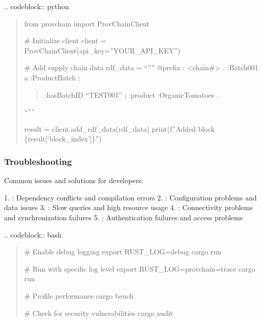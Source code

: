 \documentclass[letterpaper,10pt,english]{sphinxmanual}
\begin{document}
\sphinxAtStartPar
{}
.. code\sphinxhyphen{}block:: python
\begin{quote}

\sphinxAtStartPar
from provchain import ProvChainClient

\sphinxAtStartPar
\# Initialize client
client = ProvChainClient(api\_key=”YOUR\_API\_KEY”)

\sphinxAtStartPar
\# Add supply chain data
rdf\_data = “””
@prefix : \textless{}\sphinxhyphen{}chain\#\textgreater{} .
:Batch001 a :ProductBatch ;
\begin{quote}

\sphinxAtStartPar
:hasBatchID “TEST\sphinxhyphen{}001” ;
:product :OrganicTomatoes .
\end{quote}

\sphinxAtStartPar
“””

\sphinxAtStartPar
result = client.add\_rdf\_data(rdf\_data)
print(f”Added block \{result{[}‘block\_index’{]}\}”)
\end{quote}


\subsubsection{Troubleshooting}
\label{\detokenize{developer/index:troubleshooting}}
\sphinxAtStartPar
Common issues and solutions for developers:

\sphinxAtStartPar
{}
1. : Dependency conflicts and compilation errors
2. : Configuration problems and data issues
3. : Slow queries and high resource usage
4. : Connectivity problems and synchronization failures
5. : Authentication failures and access problems

\sphinxAtStartPar
{}
.. code\sphinxhyphen{}block:: bash
\begin{quote}

\sphinxAtStartPar
\# Enable debug logging
export RUST\_LOG=debug
cargo run

\sphinxAtStartPar
\# Run with specific log level
export RUST\_LOG=provchain=trace
cargo run

\sphinxAtStartPar
\# Profile performance
cargo bench

\sphinxAtStartPar
\# Check for security vulnerabilities
cargo audit
\end{quote}
\end{document}

